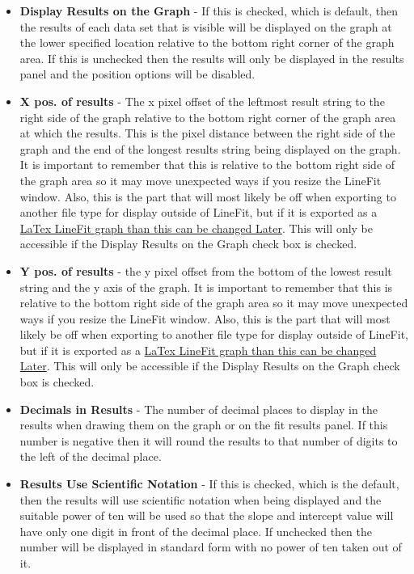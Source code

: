 \documentclass[titlepage,12pt]{article}
\begin{document}
\begin{itemize}
\item \textbf{Display Results on the Graph} - If this is checked, which is default, then the results of each data set that is visible will be displayed on the graph at the lower specified location relative to the bottom right corner of the graph area. If this is unchecked then the results will only be displayed in the results panel and the position options will be disabled.
\item \textbf{X pos. of results} - The x pixel offset of the leftmost result string to the right side of the graph relative to the bottom right corner of the graph area at which the results. This is the pixel distance between the right side of the graph and the end of the longest results string being displayed on the graph. It is important to remember that this is relative to the bottom right side of the graph area so it may move unexpected ways if you resize the LineFit window. Also, this is the part that will most likely be off when exporting to another file type for display outside of LineFit, but if it is exported as a \hyperref[sec:exlatexspace]{LaTex LineFit graph than this can be changed Later}. This will only be accessible if the Display Results on the Graph check box is checked.
\item \textbf{Y pos. of results} - the y pixel offset from the bottom of the lowest result string and the y axis of the graph. It is important to remember that this is relative to the bottom right side of the graph area so it may move unexpected ways if you resize the LineFit window. Also, this is the part that will most likely be off when exporting to another file type for display outside of LineFit, but if it is exported as a \hyperref[sec:exlatexspace]{LaTex LineFit graph than this can be changed Later}. This will only be accessible if the Display Results on the Graph check box is checked.
\item \textbf{Decimals in Results} - The number of decimal places to display in the results when drawing them on the graph or on the fit results panel. If this number is negative then it will round the results to that number of digits to the left of the decimal place.
\item \textbf{Results Use Scientific Notation} - If this is checked, which is the default, then the results will use scientific notation when being displayed and the suitable power of ten will be used so that the slope and intercept value will have only one digit in front of the decimal place. If unchecked then the number will be displayed in standard form with no power of ten taken out of it.
\end{itemize}
\end{document}
